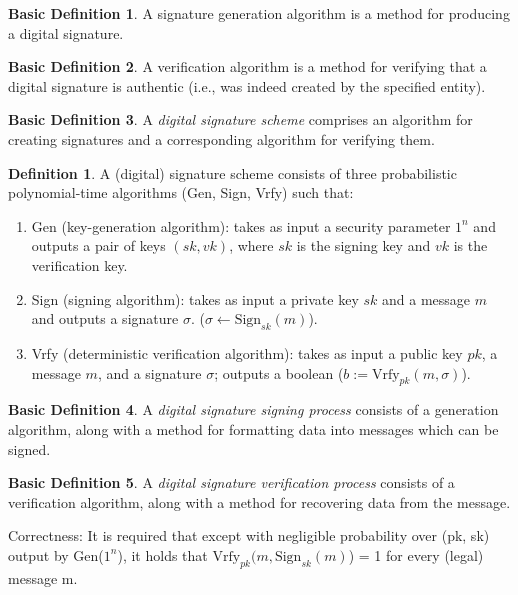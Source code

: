 \documentclass[]{final_report}
\theoremstyle{definition}
\newtheorem{definition}{Definition}[chapter]
\newtheorem{basic}{Basic Definition}
\begin{document}
\begin{basic}
A signature generation algorithm is a method for producing a digital signature.
\end{basic}

\begin{basic}
 A verification algorithm is a method for verifying that a digital signature is authentic (i.e., was indeed created by the specified entity).
\end{basic}

\begin{basic}
\label{basicDef:scheme}
A \textit{digital signature scheme} comprises an algorithm for creating signatures and a corresponding algorithm for verifying them.
\end{basic}

\begin{definition}
\label{def:digital signature}
A (digital) signature scheme consists of three probabilistic polynomial-time algorithms (Gen, Sign, Vrfy) such that:
\begin{enumerate}
    \item Gen (key-generation algorithm): takes as input a security parameter $1^n$ and outputs a pair of keys $(sk ,vk)$, where $sk$ is the signing key and $vk$ is the verification key.
    \item Sign (signing algorithm): takes as input a private key $sk$ and a message $m$ and outputs a signature $\sigma$. ($\sigma \leftarrow \text{Sign}_{sk}(m)$).
    \item Vrfy (deterministic verification algorithm):  takes as input a public key $pk$, a message $m$, and a signature $\sigma$; outputs a boolean ($b := \text{Vrfy}_{pk}(m, \sigma)$).
\end{enumerate}
\end{definition}

\begin{basic}
A \textit{digital signature signing process} consists of a generation algorithm, along with a method for formatting data into messages which can be signed.
\end{basic}

\begin{basic}
\label{basicDef:vrfy}
A \textit{digital signature verification process} consists of a verification algorithm, along with a method for recovering data from the message.
\end{basic}

Correctness: It is required that except with negligible probability over (pk, sk) output by Gen($1^n$), it holds that $\text{Vrfy}_{pk} (m, \text{Sign}_{sk}(m)$) = 1 for every (legal) message m.
\end{document}
